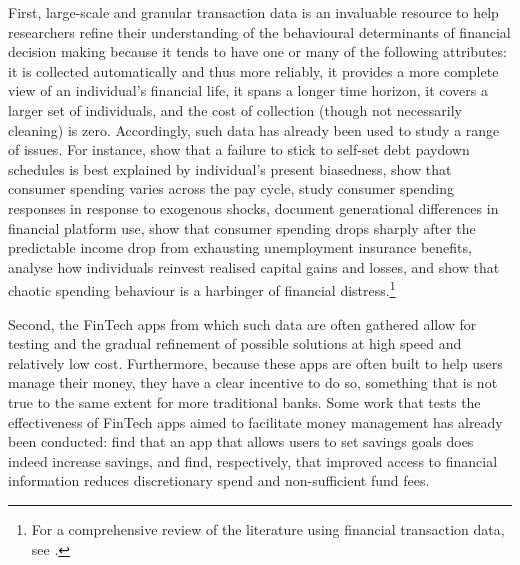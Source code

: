 First, large-scale and granular transaction data is an invaluable resource to
help researchers refine their understanding of the behavioural determinants of
financial decision making because it tends to have one or many of the following
attributes: it is collected automatically and thus more reliably, it provides a
more complete view of an individual's financial life, it spans a longer time
horizon, it covers a larger set of individuals, and the cost of collection
(though not necessarily cleaning) is zero. Accordingly, such data has already
been used to study a range of issues. For instance, \citet{kuchler2020sticking}
show that a failure to stick to self-set debt paydown schedules is best
explained by individual's present biasedness,
\citet{gelman2014harnessing,olafsson2018liquid} show that consumer spending
varies across the pay cycle, \citet{baker2018debt,baugh2014disentangling} study
consumer spending responses in response to exogenous shocks,
\citet{carlin2019generational} document generational differences in financial
platform use, \citet{ganong2019consumer} show that consumer spending drops
sharply after the predictable income drop from exhausting unemployment
insurance benefits, \citet{meyer2018fully} analyse how individuals reinvest
realised capital gains and losses, and \citet{muggleton2020evidence} show that
chaotic spending behaviour is a harbinger of financial distress.\footnote{For a
    comprehensive review of the literature using financial transaction data,
see \citet{baker2022household}.}

Second, the FinTech apps from which such data are often gathered allow for
testing and the gradual refinement of possible solutions at high speed and
relatively low cost. Furthermore, because these apps are often built to help
users manage their money, they have a clear incentive to do so, something that
is not true to the same extent for more traditional banks. Some work that tests
the effectiveness of FinTech apps aimed to facilitate money management has
already been conducted: \citet{gargano2021goal} find that an app that allows
users to set savings goals does indeed increase savings, and
\citet{levi2020mind, carlin2022mobile} find, respectively, that improved access
to financial information reduces discretionary spend and non-sufficient fund
fees.


